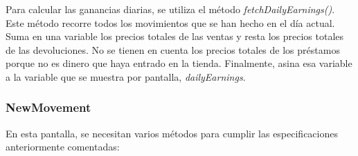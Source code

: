 Para calcular las ganancias diarias, se utiliza el método \textit{fetchDailyEarnings()}. Este método recorre todos los movimientos que se han hecho en el día actual. Suma en una variable los precios totales de las ventas y resta los precios totales de las devoluciones. No se tienen en cuenta los precios totales de los préstamos porque no es dinero que haya entrado en la tienda. Finalmente, asina esa variable a la variable que se muestra por pantalla, \textit{dailyEarnings}. 

\subsubsection{NewMovement}

En esta pantalla, se necesitan varios métodos para cumplir las especificaciones anteriormente comentadas: 

